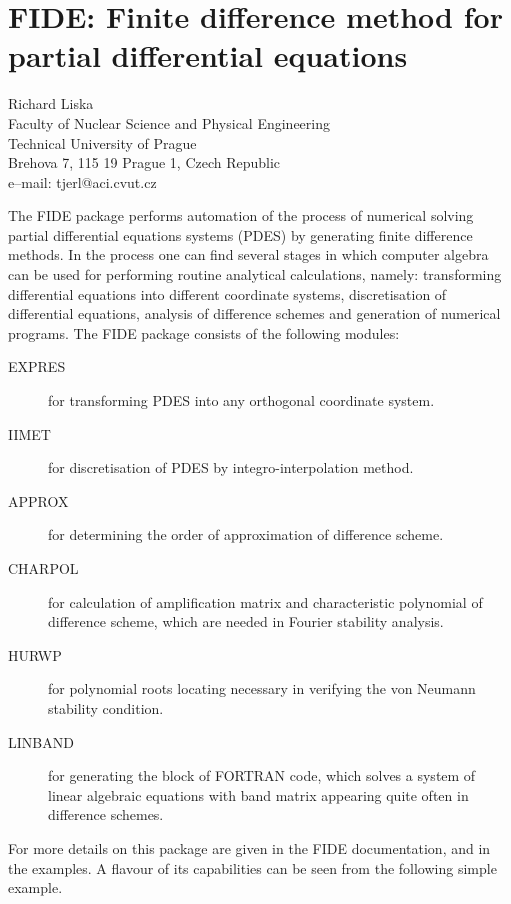 \chapter[FIDE: Finite differences for PDEs]%
        {FIDE: Finite difference method for partial differential equations}
\label{FIDE}

{\footnotesize
\begin{center}
Richard Liska \\
Faculty of Nuclear Science and Physical Engineering \\
Technical University of Prague \\
Brehova 7, 115 19 Prague 1, Czech Republic \\[0.05in]
e--mail: tjerl@aci.cvut.cz
\end{center}
}


The FIDE package performs automation of the process of numerical
solving partial differential equations systems (PDES) by generating
finite difference methods.  In the process one can find several stages
in which computer algebra can be used for performing routine
analytical calculations, namely: transforming differential equations
into different coordinate systems, discretisation of differential
equations, analysis of difference schemes and generation of numerical
programs.  The FIDE package consists of the following modules:

\begin{description}
\item[EXPRES]  for transforming PDES into any orthogonal coordinate system.
\item[IIMET]   for discretisation of PDES by integro-interpolation method.
\item[APPROX]  for determining the order of approximation of
difference scheme.
\item[CHARPOL] for calculation of amplification matrix and
characteristic polynomial of difference scheme, which are needed in
Fourier stability analysis.\
\item[HURWP] for polynomial roots locating necessary in verifying the
von Neumann stability condition.
\item[LINBAND] for generating the block of FORTRAN code, which solves
a system of linear algebraic equations with band matrix appearing
quite often in difference schemes.
\end{description}

For more details on this package are given in the FIDE documentation,
and in the examples.  A flavour of its capabilities can be seen from
the following simple example.

